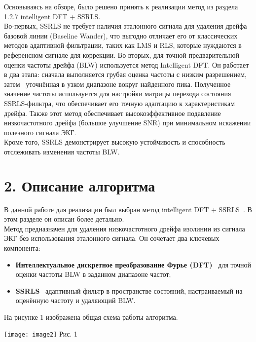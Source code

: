 \documentclass[10pt,a5paper]{article}
\numberwithin{figure}{section}
\numberwithin{table}{section}
\begin{document}
Основываясь на обзоре, было решено принять к реализации метод из раздела 1.2.7 intelligent DFT + SSRLS.\\ 
Во-первых, SSRLS не требует наличия эталонного сигнала для удаления дрейфа базовой линии (Baseline Wander), что выгодно отличает его от классических методов адаптивной фильтрации, таких как LMS и RLS, которые нуждаются в референсном сигнале для коррекции. Во-вторых, для точной предварительной оценки частоты дрейфа (BLW) используется метод Intelligent DFT. Он работает в два этапа: сначала выполняется грубая оценка частоты с низким разрешением, затем \textendash\ уточнённая в узком диапазоне вокруг найденного пика. Полученное значение частоты используется для настройки матрицы перехода состояния SSRLS-фильтра, что обеспечивает его точную адаптацию к характеристикам дрейфа. Также этот метод обеспечивает высокоэффективное подавление низкочастотного дрейфа (большое улучшение SNR) при минимальном искажении полезного сигнала ЭКГ.\\
Кроме того, SSRLS демонстрирует высокую устойчивость и способность отслеживать изменения частоты BLW.

\section{2. Описание алгоритма}
В данной работе для реализации был выбран метод intelligent DFT + SSRLS~\cite{malik2004,sheikh2016}. В этом разделе он описан более детально.\\
Метод предназначен для удаления низкочастотного дрейфа изолинии из сигнала ЭКГ без использования эталонного сигнала. Он сочетает два ключевых компонента:

\begin{itemize}
  \item \textbf{Интеллектуальное дискретное преобразование Фурье (DFT)} \textendash\ для точной оценки частоты BLW в заданном диапазоне частот;
  \item \textbf{SSRLS} \textendash\ адаптивный фильтр в пространстве состояний, настраиваемый на оценённую частоту и удаляющий BLW.
\end{itemize}

На рисунке 1 изображена общая схема работы алгоритма.	
\medskip

\noindent
\begin{minipage}{\textwidth}
	\centering
    \texttt{[image: image2]}
    \centering Рис. 1
    \label{fig:image2}
\end{minipage}
\medskip
\end{document}
